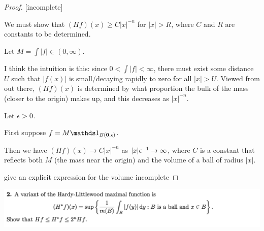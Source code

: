 \begin{proof}

  [incomplete]

  We must show that $(H f)(x) \geq C|x|^{-n}$ for $|x| > R$, where $C$ and $R$ are constants to be determined.

  Let $M = \int |f| \in (0, \infty)$.

  I think the intuition is this: since $0 < \int |f| < \infty$, there must exist some distance $U$ such
  that $|f(x)|$ is small/decaying rapidly to zero for all $|x| > U$. Viewed from out there, $(H f)(x)$ is
  determined by what proportion the bulk of the mass (closer to the origin) makes up, and this decreases
  as $|x|^{-n}$.

  Let $\epsilon > 0$.

  First suppose $f = M\ind_{B(\mathbf{0}, \eps)}$.

  Then we have $(H f)(x) \to C|x|^{-n}$ as $|x|\epsilon^{-1} \to \infty$, where $C$ is a constant that reflects
  both $M$ (the mass near the origin) and the volume of a ball of radius $|x|$.

   give an explicit expression for the volume
   incomplete
\end{proof}

\newpage
\begin{mdframed}
\includegraphics[width=400pt]{img/analysis--berkeley-202a-hw12-5314.png}
\end{mdframed}

